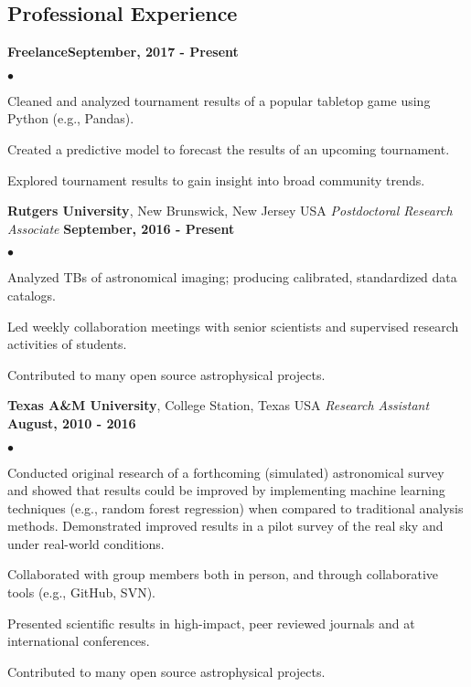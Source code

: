 \documentclass[margin,line, 11pt]{res}
\newenvironment{list2}{
  \begin{list}{$\bullet$}{%
      \setlength{\itemsep}{0in}
      \setlength{\parsep}{0in} \setlength{\parskip}{0in}
      \setlength{\topsep}{0in} \setlength{\partopsep}{0in} 
      \setlength{\leftmargin}{0.2in}}}{\end{list}}
\begin{document}
\begin{resume}
\section{Professional \newline Experience}
\textbf{Freelance}\hfill \textbf{September, 2017 - Present}\newline
    \begin{list2}
    	\vspace*{-5mm}
    	\item Cleaned and analyzed tournament results of a popular tabletop game using Python (e.g., Pandas).
    	\item Created a predictive model to forecast the results of an upcoming tournament.
    	\item Explored tournament results to gain insight into broad community trends.
    \end{list2}
    \vspace*{-4mm}
    
\textbf{Rutgers University}, New Brunswick, New Jersey USA \newline
\textit{Postdoctoral Research Associate} \hfill \textbf{September, 2016 - Present}\newline
    \begin{list2}
    	\vspace*{-5mm}
    	\item Analyzed TBs of astronomical imaging; producing calibrated, standardized data catalogs.
    	\item Led weekly collaboration meetings with senior scientists and supervised research activities of students.  
    	\item Contributed to many open source astrophysical projects.
    \end{list2}
\vspace*{-4mm}

\textbf{Texas A\&M University}, College Station, Texas USA\newline
\textit{Research Assistant} \hfill \textbf{August, 2010 - 2016}\newline
    \begin{list2}
    	\vspace*{-5mm}
    	\item Conducted original research of a forthcoming (simulated) astronomical survey and showed that results could be improved by implementing machine learning techniques (e.g., random forest regression) when compared to traditional analysis methods. Demonstrated improved results in a pilot survey of the real sky and under real-world conditions.    
    	\item Collaborated with group members both in person, and through collaborative tools (e.g., GitHub, SVN).
    	\item Presented scientific results in high-impact, peer reviewed journals and at international conferences.
    	\item Contributed to many open source astrophysical projects.
    \end{list2}
\vspace*{-4mm}


\end{resume}
\end{document}
